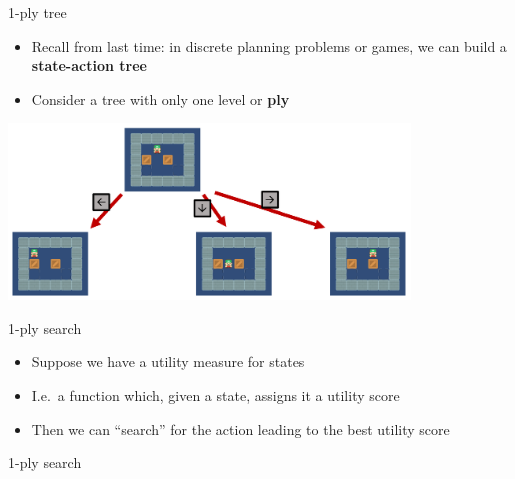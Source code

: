 \begin{frame}{1-ply tree}
    \begin{itemize}
        \pause\item Recall from last time: in discrete planning problems or games, we can build a \textbf{state-action tree}
        \pause\item Consider a tree with only one level or \textbf{ply}
    \end{itemize}
    \begin{center}
        \includegraphics[width=0.8\textwidth]{1ply}
    \end{center}
\end{frame}

\begin{frame}{1-ply search}
    \begin{itemize}
        \pause\item Suppose we have a utility measure for states
        \pause\item I.e.\ a function which, given a state, assigns it a utility score
        \pause\item Then we can ``search'' for the action leading to the best utility score
    \end{itemize}
\end{frame}

\begin{frame}{1-ply search}
    \begin{algorithmic}
    \end{algorithmic}
\end{frame}

